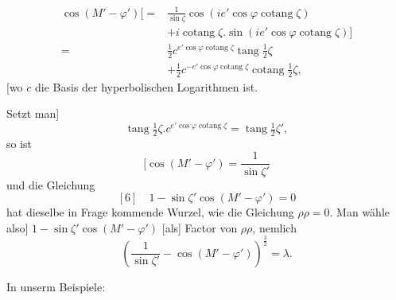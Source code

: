 \[
\begin{aligned}
\cos(M'-\varphi')\bigl[={}&\frac1{\sin\zeta}
 \cos(ie'\cos\varphi\operatorname{cotang}\zeta)\\
&+i\operatorname{cotang}\zeta\mathord{.}
 \sin(ie'\cos\varphi\operatorname{cotang}\zeta)\bigr]\\
={}&\tfrac12c^{e'\cos\varphi\operatorname{cotang}\zeta}\operatorname{tang}\tfrac12\zeta\\
&+\tfrac12c^{-e'\cos\varphi\operatorname{cotang}\zeta}\operatorname{cotang}\tfrac12\zeta,
\end{aligned}
\]
[wo \(c\) die Basis der hyperbolischen Logarithmen ist.
\par\noindent\hspace*{\parindent}Setzt man]
\[
\operatorname{tang}\tfrac12\zeta\mathord{.}c^{e'\cos\varphi\operatorname{cotang}\zeta}
 =\operatorname{tang}\tfrac12\zeta',
\]
so ist
\[
[\cos(M'-\varphi')=\frac1{\sin\zeta'}
\]
und die Gleichung
\[
[6]\quad1-\sin\zeta'\cos(M'-\varphi')=0
\]
hat dieselbe in Frage kommende Wurzel, wie die Gleichung \(\rho\rho=0\). Man wähle also]
\(1-\sin\zeta'\cos(M'-\varphi')\) [als] Factor von \(\rho\rho\), nemlich
\[
\left(\frac1{\sin\zeta'}-\cos(M'-\varphi')\right)^{\frac32}=\lambda.
\]
\par\noindent\hspace*{\parindent}In unserm Beispiele:
